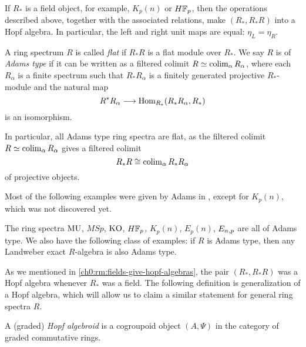 \begin{remark}
    \label{ch0:rm:fields-give-hopf-algebras}
    If $R_*$ is a field object, for example, $K_p(n)$ or $H\mathbb{F}_p$, then the operations described above, together with the associated relations, make $(R_*, R_*R)$ into a Hopf algebra. In particular, the left and right unit maps are equal: $\eta_L=\eta_R$. 
\end{remark}

\begin{definition}
    \label{ch0:def:flat-and-adams-type-ring}
    A ring spectrum $R$ is called \emph{flat} if $R_*R$ is a flat module over $R_*$. We say $R$ is of \emph{Adams type} if it can be written as a filtered colimit $R\simeq \operatorname{colim}_\alpha R_\alpha$, where each $R_\alpha$ is a finite spectrum such that $R_*R_\alpha$ is a finitely generated projective $R_*$-module and the natural map 
    \[R^*R_\alpha \longrightarrow \operatorname{Hom}_{R_*}(R_*R_\alpha, R_*)\] 
    is an isomorphism.
\end{definition}

In particular, all Adams type ring spectra are flat, as the filtered colimit $R\simeq \operatorname{colim}_\alpha R_\alpha$ gives a filtered colimit 
\[R_*R\cong \operatorname{colim}_\alpha R_*R_\alpha\] 
of projective objects. 

Most of the following examples were given by Adams in \cite[III.13.4]{adams_74}, except for $K_p(n)$, which was not discovered yet. 

\begin{example}
    \label{ch0:ex:adams-type-ring-spectra}
    The ring spectra $\mathrm{MU}$, $MSp$, $\mathrm{KO}$, $H\mathbb{F}_p$, $K_p(n)$, $E_p(n)$, $E_{n,p}$ are all of Adams type. We also have the following class of examples: if $R$ is Adams type, then any Landweber exact $R$-algebra is also Adams type. 
\end{example}

As we mentioned in \cref{ch0:rm:fields-give-hopf-algebras}, the pair $(R_*, R_*R)$ was a Hopf algebra whenever $R_*$ was a field. The following definition is generalization of a Hopf algebra, which will allow us to claim a similar statement for general ring spectra $R$. 

\begin{definition}
    \label{ch0:def:hopf-algebroid}
    A (graded) \emph{Hopf algebroid} is a cogroupoid object $(A, \Psi)$ in the category of graded commutative rings. 
\end{definition}

